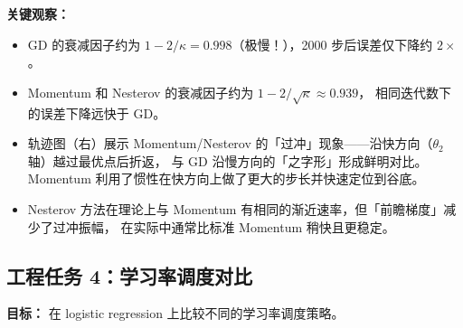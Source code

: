 \documentclass[12pt,a4paper]{ctexart}
\theoremstyle{definition}
\theoremstyle{plain}
\begin{document}
\textbf{关键观察：}

\begin{itemize}
  \item GD 的衰减因子约为 $1 - 2/\kappa = 0.998$（极慢！），2000 步后误差仅下降约 $2\times$。
  \item Momentum 和 Nesterov 的衰减因子约为 $1 - 2/\sqrt{\kappa} \approx 0.939$，
    相同迭代数下的误差下降远快于 GD。
  \item 轨迹图（右）展示 Momentum/Nesterov 的「过冲」现象——沿快方向（$\theta_2$ 轴）越过最优点后折返，
    与 GD 沿慢方向的「之字形」形成鲜明对比。Momentum 利用了惯性在快方向上做了更大的步长并快速定位到谷底。
  \item Nesterov 方法在理论上与 Momentum 有相同的渐近速率，但「前瞻梯度」减少了过冲振幅，
    在实际中通常比标准 Momentum 稍快且更稳定。
\end{itemize}

\subsection{工程任务 4：学习率调度对比}

\noindent\textbf{目标：} 在 logistic regression 上比较不同的学习率调度策略。
\end{document}

